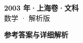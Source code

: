 \documentclass[zihao=-4, a4paper]{ctexart}
\begin{document}
\begin{center}
  {\Large\bfseries 2003 年·上海卷·文科}\\[4pt]
  {\large 数学 · 解析版}
\end{center}
\medskip
{}

\clearpage
{}
\begin{center}{\Large\bfseries 参考答案与详细解析}\end{center}
\medskip

\end{document}
